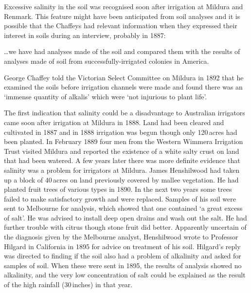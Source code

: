 Excessive salinity in the soil was recognised soon after irrigation at
Mildura and Renmark.  This feature might have been anticipated from
soil analyses  and it is possible that the
Chaffeys had relevant information when they expressed their interest
in soils during an interview, probably in 1887:
\begin{Quote}
	\ldots we have had analyses made of the soil and compared them
	with the results of analyses made of soil from
	successfully-irrigat\-ed colonies in
	America.
\end{Quote}
George Chaffey told the Victorian Select Committee on Mildura in 1892
that he examined the soils before irrigation channels were made and
found there was an `immense quantity of alkalis' which were `not
injurious to plant life'.

The first indication that salinity could be a disadvantage to
Australian irrigators came soon after irrigation at Mildura
  in 1888.
Land had been cleared and cultivated in 1887 and in 1888 irrigation
was begun though only 120\,acres had been planted.  In February 1889
four men from the Western Wimmera Irrigation Trust
 visited Mildura and
reported the existence of a white salty crust on land that had been
watered. A few years later there was more definite evidence that
salinity  was a problem for irrigators at
Mildura. James Henshilwood   had taken up a
block of 40\,acres on land previously covered by mallee 
vegetation.  He had planted fruit trees of various types in 1890.  In
the next two years some trees failed to make satisfactory growth and
were replaced.  Samples of his soil were sent to Melbourne for
analysis, which showed that one contained `a great excess of salt'.
He was advised to install deep open drains and wash out the salt.  He
had further trouble with citrus though stone fruit did better.
Apparently uncertain of the diagnosis given by the Melbourne analyst,
Henshilwood wrote to Professor Hilgard in California in 1895 for
advice on treatment of his soil.  Hilgard's reply was directed to
finding if the soil also had a problem of alkalinity and asked for
samples of soil.  When these were sent in 1895, the results of
analysis showed no alkalinity,  and the very low
concentration of salt could be explained as the result of the high
rainfall (30\,inches) in that year.

